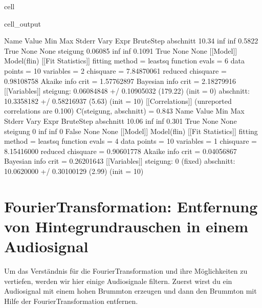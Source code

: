 \documentclass[letterpaper,10pt,english]{jupyterBook}
\begin{document}
\begin{sphinxuseclass}{cell}
\begin{sphinxVerbatimOutput}
\begin{sphinxuseclass}{cell_output}
\noindent{}

\begin{sphinxVerbatim}[commandchars=\\\{\}]
Name          Value      Min      Max   Stderr     Vary     Expr Brute\PYGZus{}Step
abschnitt     10.34     \PYGZhy{}inf      inf   0.5822     True     None     None
steigung   \PYGZhy{}0.06085     \PYGZhy{}inf      inf   0.1091     True     None     None
[[Model]]
    Model(f\PYGZus{}lin)
[[Fit Statistics]]
    \PYGZsh{} fitting method   = leastsq
    \PYGZsh{} function evals   = 6
    \PYGZsh{} data points      = 10
    \PYGZsh{} variables        = 2
    chi\PYGZhy{}square         = 7.84870061
    reduced chi\PYGZhy{}square = 0.98108758
    Akaike info crit   = 1.57762897
    Bayesian info crit = 2.18279916
[[Variables]]
    steigung:  \PYGZhy{}0.06084848 +/\PYGZhy{} 0.10905032 (179.22\PYGZpc{}) (init = 0)
    abschnitt:  10.3358182 +/\PYGZhy{} 0.58216937 (5.63\PYGZpc{}) (init = 10)
[[Correlations]] (unreported correlations are \PYGZlt{} 0.100)
    C(steigung, abschnitt) = \PYGZhy{}0.843
Name          Value      Min      Max   Stderr     Vary     Expr Brute\PYGZus{}Step
abschnitt     10.06     \PYGZhy{}inf      inf    0.301     True     None     None
steigung          0     \PYGZhy{}inf      inf        0    False     None     None
[[Model]]
    Model(f\PYGZus{}lin)
[[Fit Statistics]]
    \PYGZsh{} fitting method   = leastsq
    \PYGZsh{} function evals   = 4
    \PYGZsh{} data points      = 10
    \PYGZsh{} variables        = 1
    chi\PYGZhy{}square         = 8.15416000
    reduced chi\PYGZhy{}square = 0.90601778
    Akaike info crit   = \PYGZhy{}0.04056867
    Bayesian info crit = 0.26201643
[[Variables]]
    steigung:   0 (fixed)
    abschnitt:  10.0620000 +/\PYGZhy{} 0.30100129 (2.99\PYGZpc{}) (init = 10)
\end{sphinxVerbatim}

\noindent{}

\end{sphinxuseclass}\end{sphinxVerbatimOutput}

\end{sphinxuseclass}
\sphinxstepscope


\section{Fourier\sphinxhyphen{}Transformation: Entfernung von Hintegrundrauschen in einem Audiosignal}
\label{\detokenize{content/T_Spektralanalyse_Audio:fourier-transformation-entfernung-von-hintegrundrauschen-in-einem-audiosignal}}\label{\detokenize{content/T_Spektralanalyse_Audio::doc}}
\sphinxAtStartPar
Um das Verständnis für die Fourier\sphinxhyphen{}Transformation und ihre Möglichkeiten zu vertiefen, werden wir hier einige Audiosignale filtern. Zuerst wirst du ein Audiosignal mit einem hohen Brummton erzeugen und dann den Brummton mit Hilfe der Fourier\sphinxhyphen{}Transformation entfernen.
\end{document}
